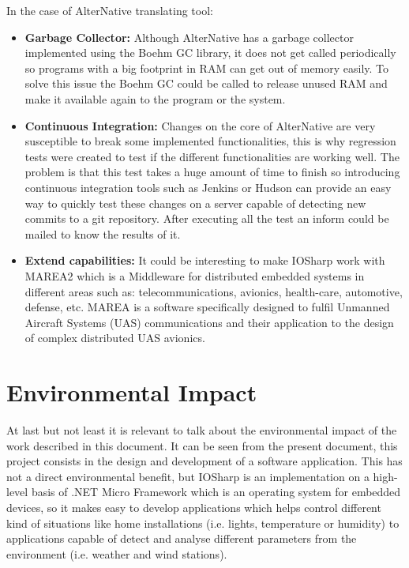In the case of AlterNative translating tool:
\begin{itemize}
\item \textbf{Garbage Collector:} Although AlterNative has a garbage collector implemented using the Boehm GC library, it does not get called periodically so programs with a big footprint in RAM can get out of memory easily. To solve this issue the Boehm GC could be called to release unused RAM and make it available again to the program or the system.

\item \textbf{Continuous Integration:} Changes on the core of AlterNative are very susceptible to break some implemented functionalities, this is why regression tests were created to test if the different functionalities are working well. The problem is that this test takes a huge amount of time to finish so introducing continuous integration tools such as Jenkins or Hudson can provide an easy way to quickly test these changes on a server capable of detecting new commits to a git repository. After executing all the test an inform could be mailed to know the results of it.

\item \textbf{Extend capabilities:} It could be interesting to make IOSharp work with MAREA2 which is a Middleware for distributed embedded systems in different areas such as: telecommunications, avionics, health-care, automotive, defense, etc. MAREA is a software specifically designed to fulfil Unmanned Aircraft Systems (UAS) communications and their application to the design of complex distributed UAS avionics.
\end{itemize}

\section{Environmental Impact}\label{S:Environmental-Impact}
At last but not least it is relevant to talk about the environmental impact of the work described in this document. It can be seen from the present document, this project consists in the design and development of a software application. This has not a direct environmental benefit, but IOSharp is an implementation on a high-level basis of .NET Micro Framework which is an operating system for embedded devices, so it makes easy to develop applications which helps control different kind of situations like home installations (i.e. lights, temperature or humidity) to applications capable of detect and analyse different parameters from the environment (i.e. weather and wind stations).